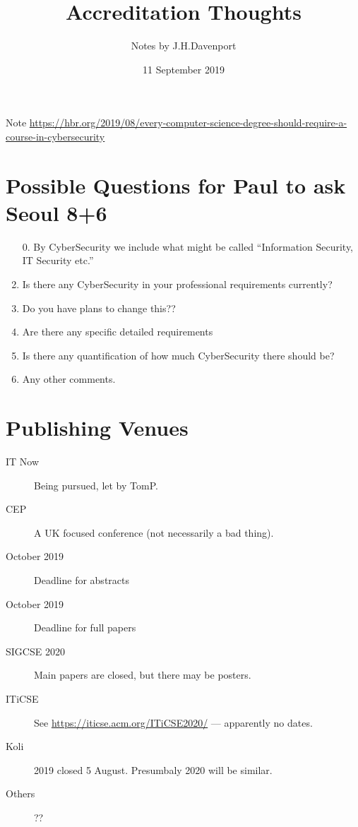 \documentclass{article}
\begin{document}
\author{Notes by J.H.Davenport}
\title{Accreditation Thoughts}
\date{11 September 2019}
\maketitle
Note \url{https://hbr.org/2019/08/every-computer-science-degree-should-require-a-course-in-cybersecurity}
\section{Possible Questions for Paul to ask Seoul 8+6}
\begin{enumerate}
\item[0.]By CyberSecurity we include what might be called ``Information Security, IT Security etc.''
\item Is there any CyberSecurity in your professional requirements currently?
\item  Do you have plans to change this??
\item Are there any specific detailed requirements
\item Is there any quantification of how much CyberSecurity there should be?
\item Any other comments.
\end{enumerate}

\section{Publishing Venues}
\begin{description}
\item[IT Now]Being pursued, let by TomP.
\item[CEP]A UK focused conference (not necessarily a bad thing).
\item[ October 2019]Deadline for abstracts
\item[ October 2019]Deadline for full papers
\item[SIGCSE 2020]Main papers are closed, but there may be posters.
\item[ITiCSE]See \url{https://iticse.acm.org/ITiCSE2020/} --- apparently no dates.
\item[Koli]2019 closed 5 August. Presumbaly 2020 will be similar.
\item[Others]??
\end{description}
\end{document}
